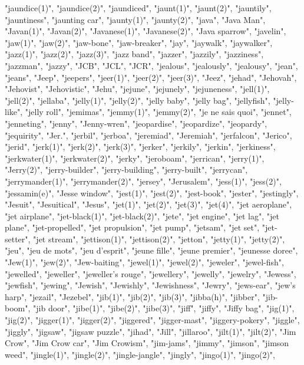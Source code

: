 "jaundice(1)",
"jaundice(2)",
"jaundiced",
"jaunt(1)",
"jaunt(2)",
"jauntily",
"jauntiness",
"jaunting car",
"jaunty(1)",
"jaunty(2)",
"java",
"Java Man",
"Javan(1)",
"Javan(2)",
"Javanese(1)",
"Javanese(2)",
"Java sparrow",
"javelin",
"jaw(1)",
"jaw(2)",
"jaw-bone",
"jaw-breaker",
"jay",
"jaywalk",
"jaywalker",
"jazz(1)",
"jazz(2)",
"jazz(3)",
"jazz band",
"jazzer",
"jazzily",
"jazziness",
"jazzman",
"jazzy",
"JCB",
"JCL",
"JCR",
"jealous",
"jealously",
"jealousy",
"jean",
"jeans",
"Jeep",
"jeepers",
"jeer(1)",
"jeer(2)",
"jeer(3)",
"Jeez",
"jehad",
"Jehovah",
"Jehovist",
"Jehovistic",
"Jehu",
"jejune",
"jejunely",
"jejuneness",
"jell(1)",
"jell(2)",
"jellaba",
"jelly(1)",
"jelly(2)",
"jelly baby",
"jelly bag",
"jellyfish",
"jelly-like",
"jelly roll",
"jemimas",
"jemmy(1)",
"jemmy(2)",
"je ne sais quoi",
"jennet",
"jenneting",
"jenny",
"Jenny-wren",
"jeopardise",
"jeopardize",
"jeopardy",
"jequirity",
"Jer.",
"jerbil",
"jerboa",
"jeremiad",
"Jeremiah",
"jerfalcon",
"Jerico",
"jerid",
"jerk(1)",
"jerk(2)",
"jerk(3)",
"jerker",
"jerkily",
"jerkin",
"jerkiness",
"jerkwater(1)",
"jerkwater(2)",
"jerky",
"jeroboam",
"jerrican",
"jerry(1)",
"Jerry(2)",
"jerry-builder",
"jerry-building",
"jerry-built",
"jerrycan",
"jerrymander(1)",
"jerrymander(2)",
"jersey",
"Jerusalem",
"jess(1)",
"jess(2)",
"jessamin(e)",
"Jesse window",
"jest(1)",
"jest(2)",
"jest-book",
"jester",
"jestingly",
"Jesuit",
"Jesuitical",
"Jesus",
"jet(1)",
"jet(2)",
"jet(3)",
"jet(4)",
"jet aeroplane",
"jet airplane",
"jet-black(1)",
"jet-black(2)",
"jete",
"jet engine",
"jet lag",
"jet plane",
"jet-propelled",
"jet propulsion",
"jet pump",
"jetsam",
"jet set",
"jet-setter",
"jet stream",
"jettison(1)",
"jettison(2)",
"jetton",
"jetty(1)",
"jetty(2)",
"jeu",
"jeu de mots",
"jeu d'esprit",
"jeune fille",
"jeune premier",
"jeunesse doree",
"Jew(1)",
"jew(2)",
"Jew-baiting",
"jewel(1)",
"jewel(2)",
"jeweler",
"jewel-fish",
"jewelled",
"jeweller",
"jeweller's rouge",
"jewellery",
"jewelly",
"jewelry",
"Jewess",
"jewfish",
"jewing",
"Jewish",
"Jewishly",
"Jewishness",
"Jewry",
"jews-ear",
"jew's harp",
"jezail",
"Jezebel",
"jib(1)",
"jib(2)",
"jib(3)",
"jibba(h)",
"jibber",
"jib-boom",
"jib door",
"jibe(1)",
"jibe(2)",
"jibe(3)",
"jiff",
"jiffy",
"Jiffy bag",
"jig(1)",
"jig(2)",
"jigger(1)",
"jigger(2)",
"jiggered",
"jigger-mast",
"jiggery-pokery",
"jiggle",
"jiggly",
"jigsaw",
"jigsaw puzzle",
"jihad",
"Jill",
"jillaroo",
"jilt(1)",
"jilt(2)",
"Jim Crow",
"Jim Crow car",
"Jim Crowism",
"jim-jams",
"jimmy",
"jimson",
"jimson weed",
"jingle(1)",
"jingle(2)",
"jingle-jangle",
"jingly",
"jingo(1)",
"jingo(2)",
